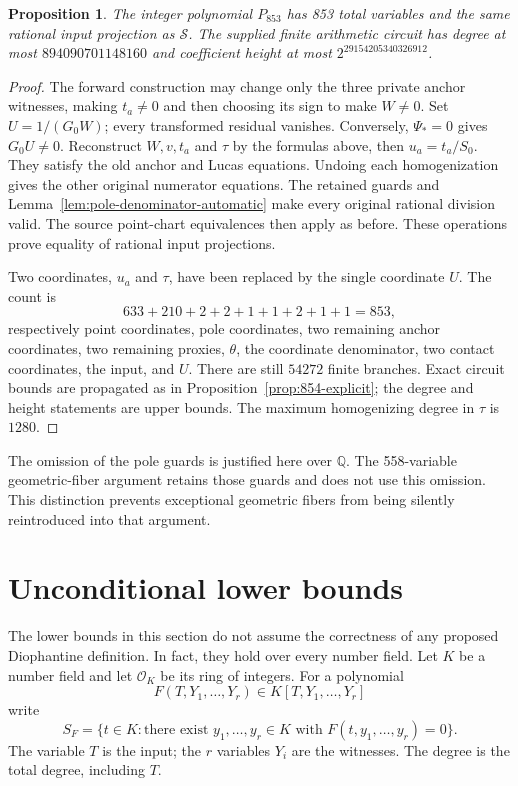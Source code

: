 \documentclass[11pt]{article}
\newtheorem{proposition}[theorem]{Proposition}
\theoremstyle{definition}
\newcommand{\Q}{\mathbb Q}
\newcommand{\Src}{\mathcal S}
\begin{document}
\begin{proposition}\label{prop:853-explicit}
The integer polynomial $P_{853}$ has 853 total variables and the
same rational input projection as $\Src$. The supplied finite
arithmetic circuit has degree at most $894090701148160$ and
coefficient height at most $2^{29154205340326912}$.
\end{proposition}
\begin{proof}
The forward construction may change only the three private anchor
witnesses, making $t_a\ne0$ and then choosing its sign to make
$W\ne0$. Set $U=1/(G_0W)$; every transformed residual vanishes.
Conversely, $\Psi_*=0$ gives $G_0U\ne0$. Reconstruct $W,v,t_a$
and $\tau$ by the formulas above, then $u_a=t_a/S_0$. They satisfy
the old anchor and Lucas equations. Undoing each homogenization gives
the other original numerator equations. The retained guards and
Lemma~\ref{lem:pole-denominator-automatic} make every original rational
division valid. The source point-chart equivalences then apply as
before. These operations prove equality of rational input projections.

Two coordinates, $u_a$ and $\tau$, have been replaced by the single
coordinate $U$. The count is
\[
 633+210+2+2+1+1+2+1+1=853,
\]
respectively point coordinates, pole coordinates, two remaining anchor
coordinates, two remaining proxies, $\theta$, the coordinate denominator,
two contact coordinates, the input, and $U$. There are still $54272$
finite branches. Exact circuit bounds are propagated as in
Proposition~\ref{prop:854-explicit}; the degree and height statements
are upper bounds. The maximum homogenizing degree in $\tau$ is $1280$.
\end{proof}

The omission of the pole guards is justified here over $\Q$.
The 558-variable geometric-fiber argument retains those guards and
does not use this omission. This distinction prevents exceptional
geometric fibers from being silently reintroduced into that argument.


\section{Unconditional lower bounds}
\label{sec:lower-bounds}

The lower bounds in this section do not assume the correctness of any proposed
Diophantine definition.  In fact, they hold over every number field.
Let $K$ be a number field and let $\mathcal O_K$ be its ring of integers.
For a polynomial
\[
 F(T,Y_1,\ldots,Y_r)\in K[T,Y_1,\ldots,Y_r]
\]
write
\[
 S_F=\{t\in K:\text{there exist }y_1,\ldots,y_r\in K
                    \text{ with }F(t,y_1,\ldots,y_r)=0\}.
\]
The variable $T$ is the input; the $r$ variables $Y_i$ are the witnesses.
The degree is the total degree, including $T$.
\end{document}
